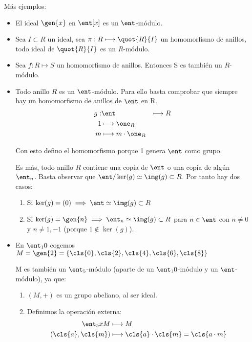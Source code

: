 Más ejemplos:
\begin{example}
	\begin{itemize}
		\item El ideal $\gen{x}$ en $\ent[x]$ es un $\ent$-módulo.
		\item Sea $I \subset R$ un ideal, sea $\pi:R\longmapsto \quot{R}{I}$ un homomorfismo de anillos, todo ideal de $\quot{R}{I}$ es un $R$-módulo.
		\item Sea $f:R \longmapsto S$ un homomorfismo de anillos. Entonces S es también un $R$-módulo.
		\item Todo anillo $R$ es un $\ent$-módulo. Para ello basta comprobar que siempre hay un homomorfismo de anillos de $\ent$ en R.
		\begin{align*}
			g:& \ent & \longmapsto  R\\
			1 & \longmapsto \one_R \\
			m & \longmapsto  m\cdot \one_R \\
		\end{align*}
		
		Con esto defino el homomorfismo porque 1 genera $\ent$ como grupo.
		
		Es más, todo anillo $R$ contiene una copia de $\ent$ o una copia de algún $\ent_n$. Basta observar que $\ent/\ker(g) \simeq \img(g) \subset R$. Por tanto hay dos casos:
		\begin{enumerate}
			\item Si $\ker(g)=(0) \implies \ent \simeq \img(g) \subset R$
			\item Si $\ker(g)=\gen{n}\implies \ent_n \simeq \img(g) \subset R$ para $n\in \ent$ con $n\neq0$ y $n\neq 1,-1$ (porque $1\notin \ker(g)$).
		\end{enumerate}
	\item En $\ent_10$ cogemos $M=\gen{2}=\{\cls{0},\cls{2},\cls{4},\cls{6},\cls{8} \}$
	
	M es también un $\ent_5$-módulo (aparte de un $\ent_10$-módulo y un $\ent$-módulo), ya que:
	\begin{enumerate}
		\item $(M,+)$ es un grupo abeliano, al ser ideal.
		\item Definimos la operación externa:
		\begin{align*}
			\ent_5 xM & \longmapsto  M \\
			(\cls{a},\cls{m}) & \longmapsto  \cls{a}\cdot \cls{m} =\cls{a\cdot m} \\
		\end{align*}
		

\end{enumerate}
\end{itemize}
\end{example}
